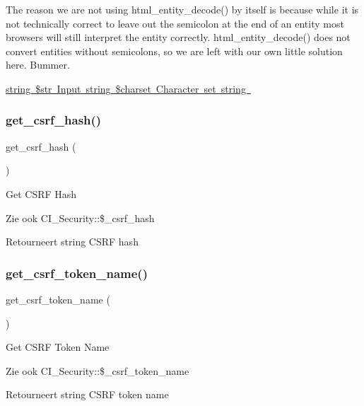 The reason we are not using html\+\_\+entity\+\_\+decode() by itself is because while it is not technically correct to leave out the semicolon at the end of an entity most browsers will still interpret the entity correctly. html\+\_\+entity\+\_\+decode() does not convert entities without semicolons, so we are left with our own little solution here. Bummer.

\mbox{\hyperlink{}{string \$str Input  string \$charset Character set  string }}\mbox{\label{class_c_i___security_a1644fd8967db3a1b94988d730ca34991}} 
\subsubsection{\texorpdfstring{get\_csrf\_hash()}{get\_csrf\_hash()}}
{\footnotesize\ttfamily get\+\_\+csrf\+\_\+hash (\begin{DoxyParamCaption}{ }\end{DoxyParamCaption})}

Get C\+S\+RF Hash

\begin{DoxySeeAlso}{Zie ook}
C\+I\+\_\+\+Security\+::\$\+\_\+csrf\+\_\+hash 
\end{DoxySeeAlso}
\begin{DoxyReturn}{Retourneert}
string C\+S\+RF hash 
\end{DoxyReturn}
\mbox{\label{class_c_i___security_a00640f51b90b7d946e9d3a4f0c9f628e}} 
\subsubsection{\texorpdfstring{get\_csrf\_token\_name()}{get\_csrf\_token\_name()}}
{\footnotesize\ttfamily get\+\_\+csrf\+\_\+token\+\_\+name (\begin{DoxyParamCaption}{ }\end{DoxyParamCaption})}

Get C\+S\+RF Token Name

\begin{DoxySeeAlso}{Zie ook}
C\+I\+\_\+\+Security\+::\$\+\_\+csrf\+\_\+token\+\_\+name 
\end{DoxySeeAlso}
\begin{DoxyReturn}{Retourneert}
string C\+S\+RF token name 
\end{DoxyReturn}
\mbox{\label{class_c_i___security_a7d1d64e6798b98cb46fcdb304a4e1de2}} 
